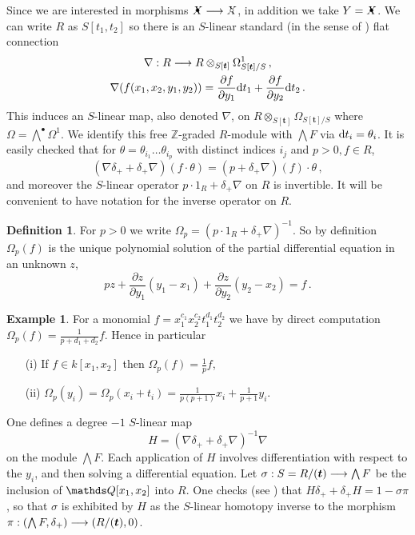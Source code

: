 \documentclass{compositio}
\theoremstyle{definition}
\newtheorem{definition}[theorem]{Definition}
\newtheorem{example}[theorem]{Example}
\numberwithin{equation}{section}
\begin{document}
Since we are interested in morphisms $\Xbul \lto \Xcirc$, in addition we take $Y = \Xbul$. We can write $R$ as $S[t_1,t_2]$ so there is an $S$-linear standard (in the sense of \cite[Section 8.1]{dm1102.2957}) flat connection
\begin{gather*}
\nabla: R \longrightarrow R \otimes_{S[\boldsymbol{t}]} \Omega^1_{S[\boldsymbol{t}]/S} \, ,\\
\nabla( f(x_1,x_2,y_1,y_2) ) = \frac{\partial f}{\partial y_1} \mathrm{d} t_1 + \frac{\partial f}{\partial y_2} \mathrm{d} t_2 \, .
\end{gather*}
This induces an $S$-linear map, also denoted $\nabla$, on $R \otimes_{S[\boldsymbol{t}]} \Omega_{S[\boldsymbol{t}]/S}$ where $\Omega = \bigwedge^\bullet \Omega^1$. We identify this free $\mathds{Z}$-graded $R$-module with $\bigwedge F$ via $\mathrm{d} t_i = \theta_i$. It is easily checked that for $\theta = \theta_{i_1} \ldots \theta_{i_p}$ with distinct indices $i_j$ and $p > 0, f \in R$,
\[
(\nabla \delta_+ + \delta_+ \nabla)(f \cdot \theta) = (p + \delta_{+}\nabla)(f) \cdot \theta \, ,
\]
and moreover the $S$-linear operator $p \cdot 1_R + \delta_{+} \nabla$ on $R$ is invertible. It will be convenient to have notation for the inverse operator on $R$.

\begin{definition}\label{defn:omega} For $p > 0$ we write $\Omega_p = (p \cdot 1_R + \delta_{+} \nabla)^{-1}$. So by definition $\Omega_p(f)$ is the unique polynomial solution of the partial differential equation in an unknown $z$,
\[
p z + \frac{\partial z}{\partial y_1} (y_1 - x_1) + \frac{\partial z}{\partial y_2}(y_2 - x_2) = f \, .
\]
\end{definition}

\begin{example}\label{example:compomega} For a monomial $f = x_1^{c_1} x_2^{c_2} t_1^{d_1} t_2^{d_2}$ we have by direct computation $\Omega_p(f) = \frac{1}{p + d_1 + d_2} f$. Hence in particular
\begin{itemize}
\item[(i)] If $f \in k[x_1,x_2]$ then $\Omega_p(f) = \frac{1}{p} f$,
\item[(ii)] $\Omega_p(y_i) = \Omega_p(x_i + t_i) = \frac{1}{p(p+1)} x_i + \frac{1}{p+1} y_i$.
\end{itemize}
\end{example}

One defines a degree $-1$ $S$-linear map
\[
H = (\nabla \delta_+ + \delta_+ \nabla)^{-1} \nabla
\]
on the module $\bigwedge F$. Each application of $H$ involves differentiation with respect to the $y_i$, and then solving a differential equation. Let $\sigma: S = R/(\boldsymbol{t}) \longrightarrow \bigwedge F$ be the inclusion of $\QQ[x_1,x_2]$ into $R$. One checks (see \cite[Section 8.1]{dm1102.2957}) that $H \delta_+ + \delta_+ H = 1 - \sigma \pi$, so that $\sigma$ is exhibited by $H$ as the $S$-linear homotopy inverse to the morphism $\pi: (\bigwedge F, \delta_+) \longrightarrow (R/(\boldsymbol{t}),0)$.
\end{document}
